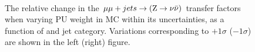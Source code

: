 \begin{figure}[!h]
  \centering
   ~~
  \\

  \caption{\label{fig:tfSyst_pu_mumuToZinv} The relative change in the
  $\mmj \rightarrow (\znunu)$ transfer
  factors when varying PU weight in MC within its uncertainties, as a function of \scalht and jet category. 
  Variations corresponding to $+1\sigma$ ($-1\sigma$) are shown in the left (right) figure. 
  }
\end{figure}

